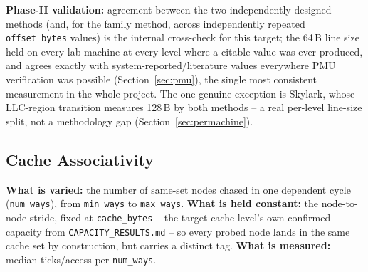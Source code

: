 \documentclass{article}
\begin{document}
\textbf{Phase-II validation:} agreement between the two independently-designed methods
(and, for the family method, across independently repeated \texttt{offset\_bytes} values)
is the internal cross-check for this target; the 64\,B line size held on every lab machine
at every level where a citable value was ever produced, and agrees exactly with
system-reported/literature values everywhere PMU verification was possible
(Section~\ref{sec:pmu}), the single most consistent measurement in the whole project. The
one genuine exception is Skylark, whose LLC-region transition measures 128\,B by both
methods -- a real per-level line-size split, not a methodology gap (Section~\ref{sec:permachine}).

\subsection{Cache Associativity}
\label{sec:assoc}

\textbf{What is varied:} the number of same-set nodes chased in one dependent cycle
(\texttt{num\_ways}), from \texttt{min\_ways} to \texttt{max\_ways}. \textbf{What is held
constant:} the node-to-node stride, fixed at \texttt{cache\_bytes} -- the target cache
level's own confirmed capacity from \texttt{CAPACITY\_RESULTS.md} -- so every probed node
lands in the same cache set by construction, but carries a distinct tag.
\textbf{What is measured:} median ticks/access per \texttt{num\_ways}.
\end{document}

